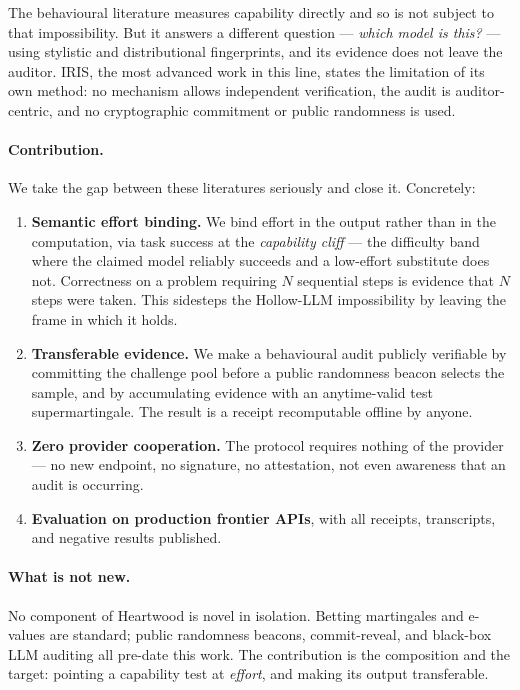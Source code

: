 \documentclass[11pt]{article}
\theoremstyle{definition}
\begin{document}
The behavioural literature measures capability directly and so is not subject to
that impossibility. But it answers a different question --- \emph{which model is
this?} --- using stylistic and distributional fingerprints, and its evidence does
not leave the auditor. IRIS, the most advanced work in this line, states the
limitation of its own method: no mechanism allows independent verification, the
audit is auditor-centric, and no cryptographic commitment or public randomness is
used.

\paragraph{Contribution.} We take the gap between these literatures seriously
and close it. Concretely:

\begin{enumerate}
\item \textbf{Semantic effort binding.} We bind effort in the output rather than
in the computation, via task success at the \emph{capability cliff} --- the
difficulty band where the claimed model reliably succeeds and a low-effort
substitute does not. Correctness on a problem requiring $N$ sequential steps is
evidence that $N$ steps were taken. This sidesteps the Hollow-LLM impossibility
by leaving the frame in which it holds.

\item \textbf{Transferable evidence.} We make a behavioural audit publicly
verifiable by committing the challenge pool before a public randomness beacon
selects the sample, and by accumulating evidence with an anytime-valid test
supermartingale. The result is a receipt recomputable offline by anyone.

\item \textbf{Zero provider cooperation.} The protocol requires nothing of the
provider --- no new endpoint, no signature, no attestation, not even awareness
that an audit is occurring.

\item \textbf{Evaluation on production frontier APIs}, with all receipts,
transcripts, and negative results published.
\end{enumerate}

\paragraph{What is not new.} No component of Heartwood is novel in isolation.
Betting martingales and e-values are standard; public randomness beacons,
commit-reveal, and black-box LLM auditing all pre-date this work. The
contribution is the composition and the target: pointing a capability test at
\emph{effort}, and making its output transferable.
\end{document}
